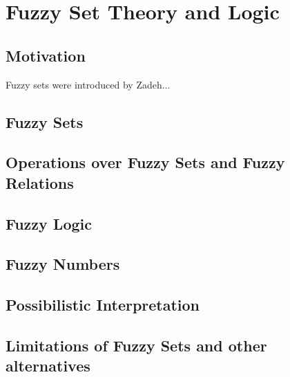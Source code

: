 \chapter{Fuzzy Set Theory and Logic}
\section*{Motivation}
Fuzzy sets were introduced by Zadeh...

\section{Fuzzy Sets}

\section{Operations over Fuzzy Sets and Fuzzy Relations}

\section{Fuzzy Logic}\label{sec:fuzzy_logic}
\section{Fuzzy Numbers}\label{sec:fuzzy_numbers}

\section{Possibilistic Interpretation}

\section{Limitations of Fuzzy Sets and other alternatives}